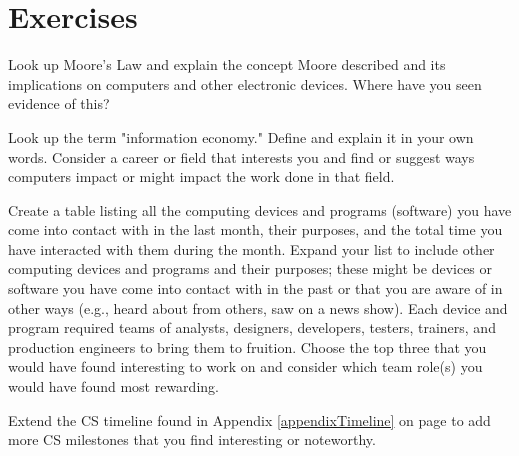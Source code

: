 \newpage

\section{Exercises}

\begin{ex}
	Look up Moore's Law and explain the concept Moore described and its implications on computers and other electronic devices. Where have you seen evidence of this?	
\end{ex}

\begin{ex}
	Look up the term "information economy." Define and explain it in your own words. Consider a career or field that interests you and find or suggest ways computers impact or might impact the work done in that field.
\end{ex}

\begin{ex}
	Create a table listing all the computing devices and programs (software) you have come into contact with in the last month, their purposes, and the total time you have interacted with them during the month. Expand your list to include other computing devices and programs and their purposes; these might be devices or software you have come into contact with in the past or that you are aware of in other ways (e.g., heard about from others, saw on a news show). Each device and program required teams of analysts, designers, developers, testers, trainers, and production engineers to bring them to fruition. Choose the top three that you would have found interesting to work on and consider which team role(s) you would have found most rewarding.
	 
\end{ex}

\begin{ex}\label{exCh18Timeline}
	Extend the CS timeline found in Appendix \ref{appendixTimeline} on page \pageref{appendixTimeline} to add more CS milestones that you find interesting or noteworthy.
\end{ex}